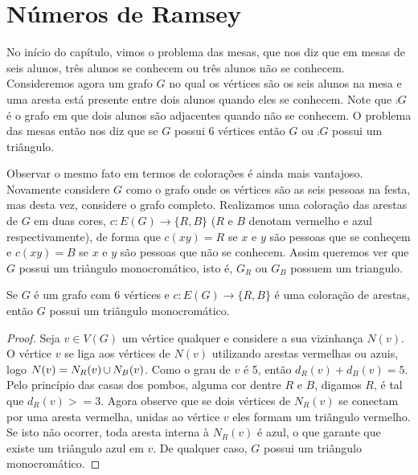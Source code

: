 


\section{Números de Ramsey}

No início do capítulo, vimos o problema das mesas, que nos diz que em mesas de seis alunos, três alunos se conhecem ou três alunos não se conhecem. Consideremos agora um grafo $G$ no qual os vértices são os seis alunos na mesa e uma aresta está presente entre dois alunos quando eles se conhecem. Note que $\comp{G}$ é o grafo em que dois alunos são adjacentes quando não se conhecem. O problema das mesas então nos diz que se $G$ possui 6 vértices então $G$ ou $\comp{G}$ possui um triângulo.

Observar o mesmo fato em termos de colorações é ainda mais vantajoso. Novamente considere $G$ como o grafo onde os vértices são as seis pessoas na festa, mas desta vez, considere o grafo completo. Realizamos uma coloração das arestas de $G$ em duas cores, $c: E(G) \to \{ R,B \}$ ($R$ e $B$ denotam vermelho e azul respectivamente), de forma que $c(xy) = R$ se $x$ e $y$ são pessoas que se conheçem e $c(xy) = B$ se $x$ e $y$ são pessoas que não se conhecem. Assim queremos ver que $G$ possui um triângulo monocromático, isto é, $G_R$ ou $G_B$ possuem um triangulo.

\begin{theorem}
Se $G$ é um grafo com 6 vértices e $c: E(G) \to \{ R,B\}$ é uma coloração de arestas, então $G$ possui um triângulo monocromático.
\end{theorem}
\begin{proof}
Seja $v \in V(G)$ um vértice qualquer e considere a sua vizinhança $N(v)$. O vértice $v$ se liga aos vértices de $N(v)$ utilizando arestas vermelhas ou azuis, logo $N(v) = N_R(v) \operatorname{\cup} N_B(v)$. Como o grau de $v$ é 5, então $d_R(v) + d_B(v) = 5$. Pelo princípio das casas dos pombos, alguma cor dentre $R$ e $B$, digamos $R$, é tal que $d_R(v) >= 3$. Agora observe que se dois vértices de $N_R(v)$ se conectam por uma aresta vermelha, unidas ao vértice $v$ eles formam um triângulo vermelho. Se isto não ocorrer, toda aresta interna à $N_R(v)$ é azul, o que garante que existe um triângulo azul em $v$. De qualquer caso, $G$ possui um triângulo monocromático.

\end{proof}

